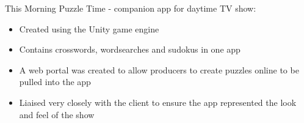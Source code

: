 \item This Morning Puzzle Time - companion app for daytime TV show:
\begin{itemize}
    \item Created using the Unity game engine
    \item Contains crosswords, wordsearches and sudokus in one app
    \item A web portal was created to allow producers to create puzzles online to be pulled into the app
    \item Liaised very closely with the client to ensure the app represented the look and feel of the show
\end{itemize}
